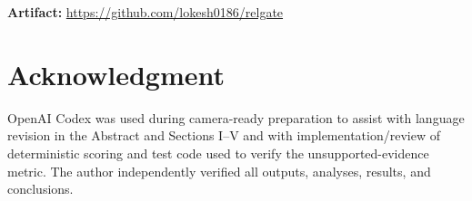 \documentclass[conference]{IEEEtran}
\begin{document}
\textbf{Artifact:} \url{https://github.com/lokesh0186/relgate}

\section*{Acknowledgment}
OpenAI Codex was used during camera-ready preparation to assist with language revision in the Abstract and Sections I--V and with implementation/review of deterministic scoring and test code used to verify the unsupported-evidence metric. The author independently verified all outputs, analyses, results, and conclusions.



\end{document}
